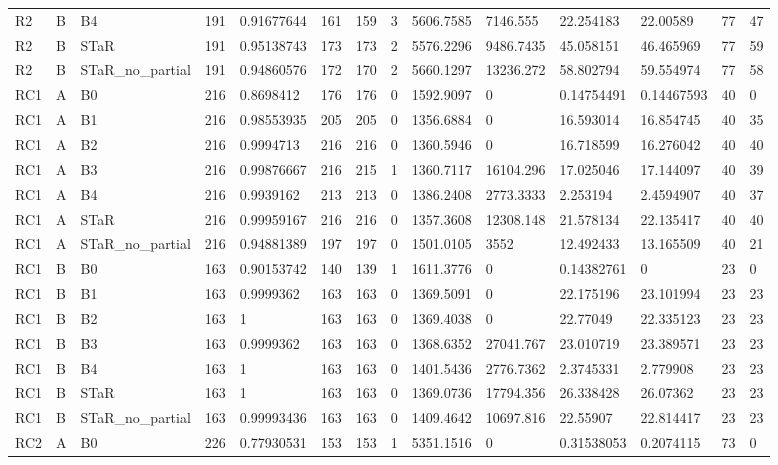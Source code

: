 \begin{longtable}{llllllllllllll}
R2 & B & B4 & 191 & 0.91677644 & 161 & 159 & 3 & 5606.7585 & 7146.555 & 22.254183 & 22.00589 & 77 & 47 \\
R2 & B & STaR & 191 & 0.95138743 & 173 & 173 & 2 & 5576.2296 & 9486.7435 & 45.058151 & 46.465969 & 77 & 59 \\
R2 & B & STaR\_no\_partial & 191 & 0.94860576 & 172 & 170 & 2 & 5660.1297 & 13236.272 & 58.802794 & 59.554974 & 77 & 58 \\
RC1 & A & B0 & 216 & 0.8698412 & 176 & 176 & 0 & 1592.9097 & 0 & 0.14754491 & 0.14467593 & 40 & 0 \\
RC1 & A & B1 & 216 & 0.98553935 & 205 & 205 & 0 & 1356.6884 & 0 & 16.593014 & 16.854745 & 40 & 35 \\
RC1 & A & B2 & 216 & 0.9994713 & 216 & 216 & 0 & 1360.5946 & 0 & 16.718599 & 16.276042 & 40 & 40 \\
RC1 & A & B3 & 216 & 0.99876667 & 216 & 215 & 1 & 1360.7117 & 16104.296 & 17.025046 & 17.144097 & 40 & 39 \\
RC1 & A & B4 & 216 & 0.9939162 & 213 & 213 & 0 & 1386.2408 & 2773.3333 & 2.253194 & 2.4594907 & 40 & 37 \\
RC1 & A & STaR & 216 & 0.99959167 & 216 & 216 & 0 & 1357.3608 & 12308.148 & 21.578134 & 22.135417 & 40 & 40 \\
RC1 & A & STaR\_no\_partial & 216 & 0.94881389 & 197 & 197 & 0 & 1501.0105 & 3552 & 12.492433 & 13.165509 & 40 & 21 \\
RC1 & B & B0 & 163 & 0.90153742 & 140 & 139 & 1 & 1611.3776 & 0 & 0.14382761 & 0 & 23 & 0 \\
RC1 & B & B1 & 163 & 0.9999362 & 163 & 163 & 0 & 1369.5091 & 0 & 22.175196 & 23.101994 & 23 & 23 \\
RC1 & B & B2 & 163 & 1 & 163 & 163 & 0 & 1369.4038 & 0 & 22.77049 & 22.335123 & 23 & 23 \\
RC1 & B & B3 & 163 & 0.9999362 & 163 & 163 & 0 & 1368.6352 & 27041.767 & 23.010719 & 23.389571 & 23 & 23 \\
RC1 & B & B4 & 163 & 1 & 163 & 163 & 0 & 1401.5436 & 2776.7362 & 2.3745331 & 2.779908 & 23 & 23 \\
RC1 & B & STaR & 163 & 1 & 163 & 163 & 0 & 1369.0736 & 17794.356 & 26.338428 & 26.07362 & 23 & 23 \\
RC1 & B & STaR\_no\_partial & 163 & 0.99993436 & 163 & 163 & 0 & 1409.4642 & 10697.816 & 22.55907 & 22.814417 & 23 & 23 \\
RC2 & A & B0 & 226 & 0.77930531 & 153 & 153 & 1 & 5351.1516 & 0 & 0.31538053 & 0.2074115 & 73 & 0 \\

\end{longtable}

